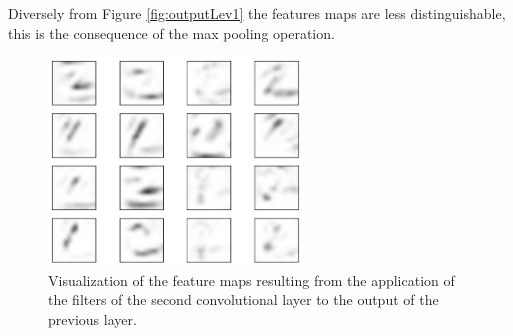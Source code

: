 Diversely from Figure \ref{fig:outputLev1} the features maps are less distinguishable, this is the consequence of the max pooling operation.

\begin{figure}
	\centering
	\includegraphics[width=0.6\textwidth]{Images/conv_outputLev2_digit2}
	\caption{Visualization of the feature maps resulting from the application of the filters of the second convolutional layer to the output of the previous layer.}
	\label{fig:outputLev2}
\end{figure}

